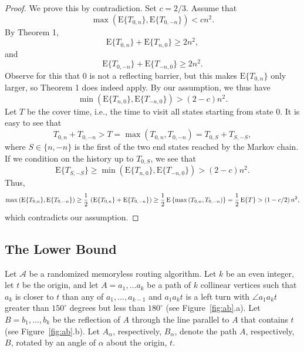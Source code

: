 \documentclass [letterpaper] {patmorin}
\newcommand{\EXP}{\mathrm{E}}
\begin{document}
\begin{proof}
We prove this by contradiction. Set $c = 2/3$. Assume that
\[
\max \left( \EXP \{ T_{0,n} \} , \EXP \{ T_{0,-n} \} \right) <  cn^2.
\]
By Theorem 1,
\[
 \EXP \{ T_{0,n} \}  +  \EXP \{ T_{n,0} \}  \ge 2n^2,
\]
and
\[
 \EXP \{ T_{0,-n} \}  +  \EXP \{ T_{-n,0} \}  \ge 2n^2.
\]
Observe for this that $0$ is not a reflecting barrier, but this makes 
$ \EXP \{ T_{0,n} \}$ only larger, so Theorem 1 does indeed apply.
By our assumption, we thus have
\[
\min \left( \EXP \{ T_{n,0} \} ,  \EXP \{ T_{-n,0} \} \right) >  (2-c) n^2.
\]
Let $T$ be the cover time, i.e., the time to visit all states starting from state $0$. It is easy to see that
\[
T_{0,n} + T_{0,-n} > T = \max \left( T_{0,n} , T_{0,-n} \right)
  =  T_{0,S} + T_{S,-S},
\]
where $S \in \{ n, -n \}$ is the first of the two end states
reached by the Markov chain. If we condition on the history up to $T_{0,S}$,
we see that
\[
\EXP \{ T_{S,-S} \} \ge \min \left( \EXP \{ T_{n,0} \} ,  \EXP \{ T_{-n,0} \} \right) >  (2-c) n^2.
\]
Thus,
\[
\max \left( \EXP \{ T_{0,n} \} , \EXP \{ T_{0,-n} \} \right)
 \ge {1 \over 2} \, \left( \EXP \{ T_{0,n} \} + \EXP \{ T_{0,-n} \} \right)
 \ge {1 \over 2} \, \EXP \left\{ \max \left( T_{0,n} , T_{0,-n} \right) \right\} 
= {1 \over 2} \, \EXP \{ T \}
>  (1- c/2 ) \,  n^2 ,
\]
which contradicts our assumption.
\end{proof}


\subsection{The Lower Bound}
\label{sec:bound}

Let $\mathcal{A}$ be a randomized memoryless routing algorithm.  Let $k$
be an even integer, let $t$ be the origin, and let $A=a_1,\ldots a_k$ be
a path of $k$ collinear vertices such that $a_{k}$ is closer to $t$ than
any of $a_1,\ldots,a_{k-1}$ and $a_{1}a_{k}t$ is a left turn with $\angle
a_{1}a_{k}t$ greater than $150^\circ$ degrees but less than $180^\circ$ (see Figure~\ref{fig:ab}.a). Let
$B=b_1,\ldots,b_k$ be the reflection of $A$ through the line parallel
to $A$ that contains $t$ (see Figure~\ref{fig:ab}.b).  Let $A_\alpha$,
respectively, $B_\alpha$, denote the path $A$, respectively, $B$,
rotated by an angle of $\alpha$ about the origin, $t$.
\end{document}
